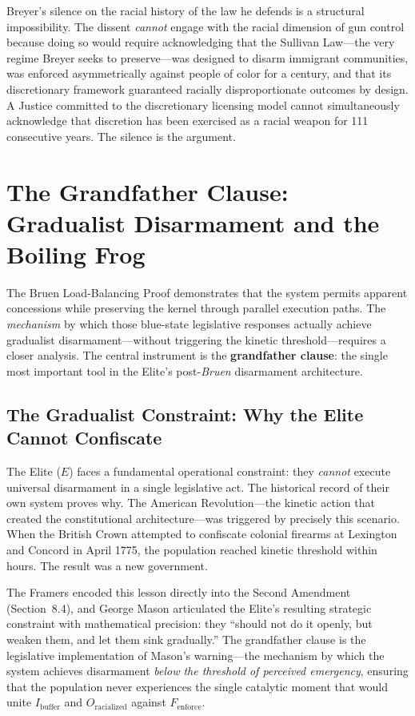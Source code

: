 Breyer's silence on the racial history of the law he defends is a structural impossibility. The dissent \textit{cannot} engage with the racial dimension of gun control because doing so would require acknowledging that the Sullivan Law---the very regime Breyer seeks to preserve---was designed to disarm immigrant communities, was enforced asymmetrically against people of color for a century, and that its discretionary framework guaranteed racially disproportionate outcomes by design. A Justice committed to the discretionary licensing model cannot simultaneously acknowledge that discretion has been exercised as a racial weapon for 111 consecutive years. The silence is the argument.

\section{The Grandfather Clause: Gradualist Disarmament and the Boiling Frog}

The Bruen Load-Balancing Proof demonstrates that the system permits apparent concessions while preserving the kernel through parallel execution paths. The \textit{mechanism} by which those blue-state legislative responses actually achieve gradualist disarmament---without triggering the kinetic threshold---requires a closer analysis. The central instrument is the \textbf{grandfather clause}: the single most important tool in the Elite's post-\textit{Bruen} disarmament architecture.

\subsection{The Gradualist Constraint: Why the Elite Cannot Confiscate}

The Elite ($E$) faces a fundamental operational constraint: they \textit{cannot} execute universal disarmament in a single legislative act. The historical record of their own system proves why. The American Revolution---the kinetic action that created the constitutional architecture---was triggered by precisely this scenario. When the British Crown attempted to confiscate colonial firearms at Lexington and Concord in April 1775, the population reached kinetic threshold within hours. The result was a new government.

The Framers encoded this lesson directly into the Second Amendment (Section~8.4), and George Mason articulated the Elite's resulting strategic constraint with mathematical precision: they ``should not do it openly, but weaken them, and let them sink gradually.'' The grandfather clause is the legislative implementation of Mason's warning---the mechanism by which the system achieves disarmament \textit{below the threshold of perceived emergency}, ensuring that the population never experiences the single catalytic moment that would unite $I_{\text{buffer}}$ and $O_{\text{racialized}}$ against $F_{\text{enforce}}$.

